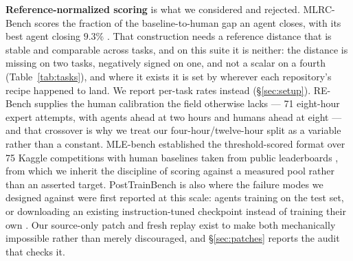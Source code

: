 \textbf{Reference-normalized scoring} is what we considered and rejected. MLRC-Bench scores the fraction
of the baseline-to-human gap an agent closes, with its best agent closing $9.3\%$
\citep{zhang2025mlrcbench}. That construction needs a reference distance that is stable and comparable
across tasks, and on this suite it is neither: the distance is missing on two tasks, negatively signed on
one, and not a scalar on a fourth (Table~\ref{tab:tasks}), and where it exists it is set by wherever each
repository's recipe happened to land. We report per-task rates instead (\S\ref{sec:setup}). RE-Bench
supplies the human calibration the field otherwise lacks --- 71 eight-hour expert attempts, with agents
ahead at two hours and humans ahead at eight \citep{wijk2024rebench} --- and that crossover is why we
treat our four-hour/twelve-hour split as a variable rather than a constant. MLE-bench established the
threshold-scored format over 75 Kaggle competitions with human baselines taken from public leaderboards
\citep{chan2024mlebench}, from which we inherit the discipline of scoring against a measured pool
rather than an asserted target. PostTrainBench is also where the failure modes we designed against were
first reported at this scale: agents training on the test set, or downloading an existing
instruction-tuned checkpoint instead of training their own \citep{rank2026posttrainbench}. Our
source-only patch and fresh replay exist to make both mechanically impossible rather than merely
discouraged, and \S\ref{sec:patches} reports the audit that checks it.

